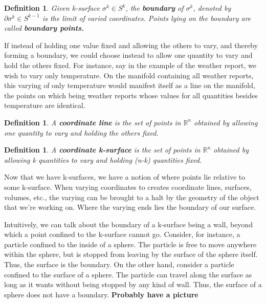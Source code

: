 \documentclass{book}
\newtheorem{defn}[equation]{Definition}
\begin{document}
\begin{defn}
	Given k-surface $\sigma^k \in S^k$, the \textbf{boundary} of $\sigma^k$, denoted by $\partial\sigma^k \in S^{k-1}$ is the limit of varied coordinates. Points lying on the boundary are called \textbf{boundary points.}
\end{defn}


If instead of holding one value fixed and allowing the others to vary, and thereby forming a boundary, we could choose instead to allow one quantity to vary and hold the others fixed. For instance, say in the example of the weather report, we wish to vary only temperature. On the manifold containing all weather reports, this varying of only temperature would manifest itself as a line on the manifold, the points on which being weather reports whose values for all quantities besides temperature are identical. 

\begin{defn}
	A \textbf{coordinate line} is the set of points in $\mathbb{R}^n$ obtained by allowing one quantity to vary and holding the others fixed. 
\end{defn}

\begin{defn}
	A \textbf{coordinate k-surface} is the set of points in $\mathbb{R}^n$ obtained by allowing k quantities to vary and holding (n-k) quantities fixed.  
\end{defn}


Now that we have k-surfaces, we have a notion of where points lie relative to some k-surface. When varying coordinates to creates coordinate lines, surfaces, volumes, etc., the varying can be brought to a halt by the geometry of the object that we're working on. Where the varying ends lies the boundary of our surface. 





Intuitively, we can talk about the boundary of a k-surface being a wall, beyond which a point confined to the k-surface cannot go. Consider, for instance, a particle confined to the inside of a sphere. The particle is free to move anywhere within the sphere, but is stopped from leaving by the surface of the sphere itself. Thus, the surface is the boundary. On the other hand, consider a particle confined to the surface of a sphere. The particle can travel along the surface as long as it wants without being stopped by any kind of wall. Thus, the surface of a sphere does not have a boundary. \textbf{Probably have a picture}
\end{document}
